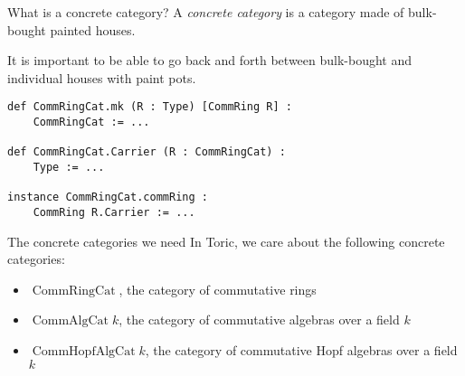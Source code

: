 \documentclass[10pt, handout]{beamer}
\DeclareMathOperator{\CommRingCat}{CommRingCat}
\DeclareMathOperator{\CommAlgCat}{CommAlgCat}
\DeclareMathOperator{\CommHopfAlgCat}{CommHopfAlgCat}
\begin{document}
\begin{frame}[fragile]{What is a concrete category?}
    A \emph{concrete category} is a category made of bulk-bought painted houses.

    \pause

    It is important to be able to go back and forth between bulk-bought and individual houses with paint pots.
    \begin{verbatim}
def CommRingCat.mk (R : Type) [CommRing R] :
    CommRingCat := ...

def CommRingCat.Carrier (R : CommRingCat) :
    Type := ...

instance CommRingCat.commRing :
    CommRing R.Carrier := ...
    \end{verbatim}
\end{frame}


\begin{frame}{The concrete categories we need}
    In Toric, we care about the following concrete categories:
    \begin{itemize}
        \item $\CommRingCat$, the category of commutative rings
        \item $\CommAlgCat k$, the category of commutative algebras over a field $k$
        \item $\CommHopfAlgCat k$, the category of commutative Hopf algebras over a field $k$
    \end{itemize}
\end{frame}
\end{document}
